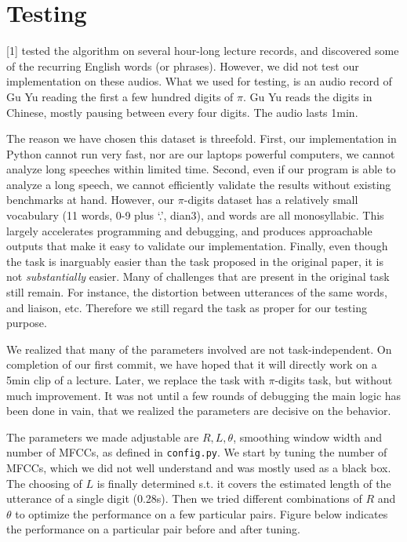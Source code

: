 \documentclass{article}
\begin{document}
\section{Testing}
    [1] tested the algorithm on several hour-long lecture records, and discovered some of the recurring
    English words (or phrases). However, we did not test our implementation on these audios. What we used 
    for testing, is an audio record of Gu Yu reading the first a few hundred digits of $\pi$. Gu Yu reads
    the digits in Chinese, mostly pausing between every four digits. The audio lasts 1min.

    The reason we have chosen this dataset is threefold. First, our implementation in Python cannot run very 
    fast, nor are our laptops powerful computers, we cannot analyze long speeches within limited time. Second,
    even if our program is able to analyze a long speech, we cannot efficiently validate the results
    without existing benchmarks at hand. However, our $\pi$-digits dataset has a relatively small vocabulary
    (11 words, 0-9 plus `.', dian3), and words are all monosyllabic. This largely accelerates programming
    and debugging, and produces approachable outputs that make it easy to validate our implementation.
    Finally, even though the task is inarguably easier than the task proposed in the original paper, it 
    is not \emph{substantially} easier. Many of challenges that are present in the original task still remain.
    For instance, the distortion between utterances of the same words, and liaison, 
    etc. Therefore we still regard the task as proper for our testing purpose.

    We realized that many of the parameters involved are not task-independent. On completion of our first
    commit, we have hoped that it will directly work on a 5min clip of a lecture. Later, we replace the 
    task with $\pi$-digits task, but without much improvement. It was not until a few rounds of debugging 
    the main logic has been done in vain, that we realized the parameters are decisive on the behavior.

    The parameters we made adjustable are $R, L, \theta$, smoothing window width and number of MFCCs, 
    as defined in \texttt{config.py}.
    We start by tuning the number of MFCCs, which we did not well understand and was mostly used as 
    a black box. The choosing of $L$ is finally determined s.t. it covers the estimated length of the utterance 
    of a single digit (0.28s). Then we tried different combinations of $R$ and $\theta$ to optimize 
    the performance on a few particular pairs. Figure below indicates the performance on a particular pair
    before and after tuning.
\end{document}

